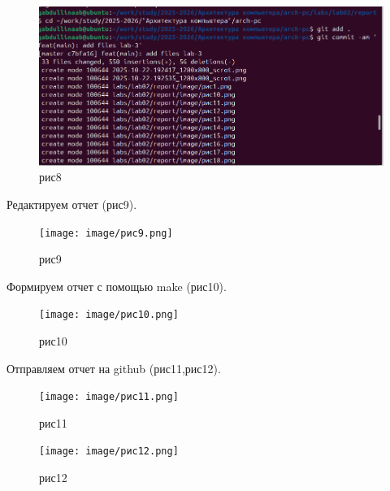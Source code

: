 \documentclass[
  english,
  russian,
  12pt,
  a4paper,
  DIV=11,
  numbers=noendperiod]{scrreprt}
\begin{document}
\begin{figure}

{\centering \includegraphics[width=0.9\linewidth,height=\textheight,keepaspectratio]{image/рис8.png}

}

\caption{рис8}

\end{figure}%

Редактируем отчет (рис9).

\begin{figure}

{\centering \texttt{[image: image/рис9.png]}

}

\caption{рис9}

\end{figure}%

Формируем отчет с помощью make (рис10).

\begin{figure}

{\centering \texttt{[image: image/рис10.png]}

}

\caption{рис10}

\end{figure}%

Отправляем отчет на github (рис11,рис12).

\begin{figure}

{\centering \texttt{[image: image/рис11.png]}

}

\caption{рис11}

\end{figure}%

\begin{figure}

{\centering \texttt{[image: image/рис12.png]}

}

\caption{рис12}

\end{figure}%
\end{document}
